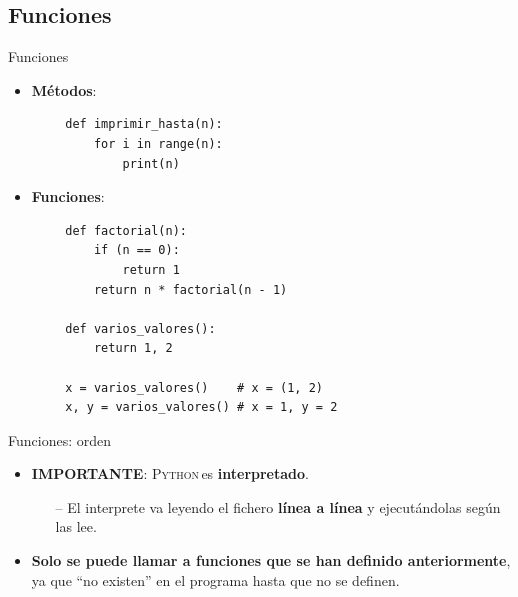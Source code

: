 \documentclass[10pt]{beamer} %
\newcommand{\py}{\textsc{Python}}
\begin{document}
\subsection{Funciones}
\begin{frame}[fragile]{Funciones}
    \begin{itemize}
        \item \textbf{Métodos}:
    \end{itemize}
    \begin{verbatim}
        def imprimir_hasta(n):
            for i in range(n):
                print(n)
    \end{verbatim}
    \begin{itemize}
        \item \textbf{Funciones}:
    \end{itemize}
    \begin{verbatim}
        def factorial(n):
            if (n == 0):
                return 1
            return n * factorial(n - 1)
        
        def varios_valores():
            return 1, 2
        
        x = varios_valores()    # x = (1, 2)
        x, y = varios_valores() # x = 1, y = 2
    \end{verbatim}
\end{frame}

\begin{frame}{Funciones: orden}
    \begin{itemize}
        \item \textbf{IMPORTANTE}: \py\,es \textbf{interpretado}.
        \begin{itemize}
            \item[--] El interprete va leyendo el fichero \textbf{línea a línea} y ejecutándolas según las lee.
        \end{itemize}
        \item \textbf{Solo se puede llamar a funciones que se han definido anteriormente}, ya que ``no existen'' en el programa hasta que no se definen.
    \end{itemize}
\end{frame}
\end{document}
